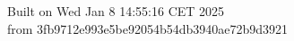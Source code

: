 {\noindent Built on Wed Jan  8 14:55:16 CET 2025} \\ 
 {\noindent from 3fb9712e993e5be92054b54db3940ae72b9d3921}

